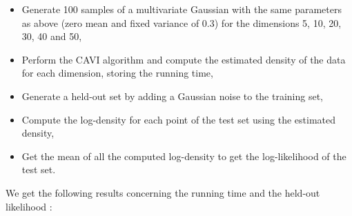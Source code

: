 \documentclass{article}
\begin{document}
\begin{itemize}
    \item Generate 100 samples of a multivariate Gaussian with the same parameters as above (zero mean and fixed variance of 0.3) for the dimensions 5, 10, 20, 30, 40 and 50,
    \item Perform the CAVI algorithm and compute the estimated density of the data for each dimension, storing the running time,
    \item Generate a held-out set by adding a Gaussian noise to the training set,
    \item Compute the log-density for each point of the test set using the estimated density,
    \item Get the mean of all the computed log-density to get the log-likelihood of the test set.
\end{itemize}

We get the following results concerning the running time and the held-out likelihood :
\end{document}
